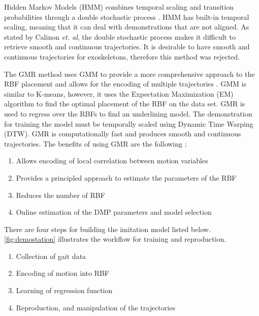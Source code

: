Hidden Markov Models (HMM) combines temporal scaling and transition probabilities through a double stochastic process \cite{calinon2007learning}. HMM has built-in temporal scaling, meaning that it can deal with demonstrations that are not aligned. As stated by Calinon \textit{et. al}, the double stochastic process makes it difficult to retrieve smooth and continuous trajectories. It is desirable to have smooth and continuous trajectories for exoskeletons, therefore this method was rejected. 

The GMR method uses GMM to provide a more comprehensive approach to the RBF placement and allows for the encoding of multiple trajectories \cite{calinon2013compliant}. GMM is similar to K-means, however, it uses the Expectation Maximization (EM) algorithm to find the optimal placement of the RBF on the data set. GMR is used to regress over the RBFs to find an underlining model.  The demonstration for training the model must be temporally scaled using Dynamic Time Warping (DTW). GMR is computationally fast and produces smooth and continuous trajectories. The benefits of using GMR are the following \cite{Calinon}: 


\begin{enumerate}  
    \item Allows encoding of local correlation between motion variables
    \item Provides a principled approach to estimate the parameters of the RBF 
    \item Reduces the number of RBF   
    \item Online estimation of the DMP parameters and model selection   
\end{enumerate}  

There are four steps for building the imitation model listed below. \autoref{fig:demostation} illustrates the workflow for training and reproduction.

\begin{enumerate}
    \item Collection of gait data
    \item Encoding of motion into RBF
    \item Learning of regression function
    \item Reproduction, and manipulation of the trajectories
\end{enumerate}

